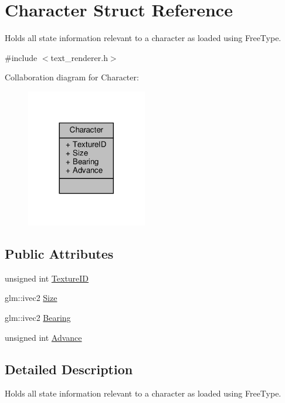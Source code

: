\hypertarget{structCharacter}{}\section{Character Struct Reference}
\label{structCharacter}


Holds all state information relevant to a character as loaded using Free\+Type.  




{\ttfamily \#include $<$text\+\_\+renderer.\+h$>$}



Collaboration diagram for Character\+:
\nopagebreak
\begin{figure}[H]
\begin{center}
\leavevmode
\includegraphics[width=149pt]{structCharacter__coll__graph}
\end{center}
\end{figure}
\subsection*{Public Attributes}
\begin{DoxyCompactItemize}
\item 
unsigned int \hyperlink{structCharacter_a411760a6a33f2cb54dd6a0138e038a46}{Texture\+ID}
\item 
glm\+::ivec2 \hyperlink{structCharacter_aaaa598050e0ef590fe6903fd2bab40b8}{Size}
\item 
glm\+::ivec2 \hyperlink{structCharacter_afef98bf9c7f5313d96476f6f3f85f872}{Bearing}
\item 
unsigned int \hyperlink{structCharacter_a5338c0800545802a63f8e4945573cbe7}{Advance}
\end{DoxyCompactItemize}


\subsection{Detailed Description}
Holds all state information relevant to a character as loaded using Free\+Type. 

